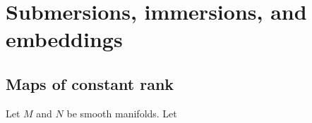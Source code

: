 
\chapter{Submersions, immersions, and embeddings}

\section{Maps of constant rank}

\begin{definition}
    Let $M$ and $N$ be smooth manifolds. Let 
\end{definition}
